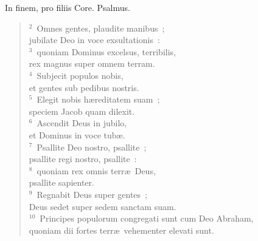 \lettrine[lines=3,image=true,loversize=0.05,lraise=-0.03]{I}{}n finem, pro filiis Core. Psalmus.
\begin{flushleft}\begin{verse}\vspace{6pt}${}^{2}$~Omnes gentes, plaudite manibus~;\\ jubilate Deo in voce exsultationis~:\\
${}^{3}$~quoniam Dominus excelsus, terribilis,\\ rex magnus super omnem terram.\\
${}^{4}$~Subjecit populos nobis,\\ et gentes sub pedibus nostris.\\
${}^{5}$~Elegit nobis h\ae reditatem suam~;\\ speciem Jacob quam dilexit.\\
${}^{6}$~Ascendit Deus in jubilo,\\ et Dominus in voce tub\ae .\\
${}^{7}$~Psallite Deo nostro, psallite~;\\ psallite regi nostro, psallite~:\\
${}^{8}$~quoniam rex omnis terr\ae\ Deus,\\ psallite sapienter.\\
${}^{9}$~Regnabit Deus super gentes~;\\ Deus sedet super sedem sanctam suam.\\
${}^{10}$~Principes populorum congregati sunt cum Deo Abraham,\\ quoniam dii fortes terr\ae\ vehementer elevati sunt.\end{verse}\end{flushleft}



